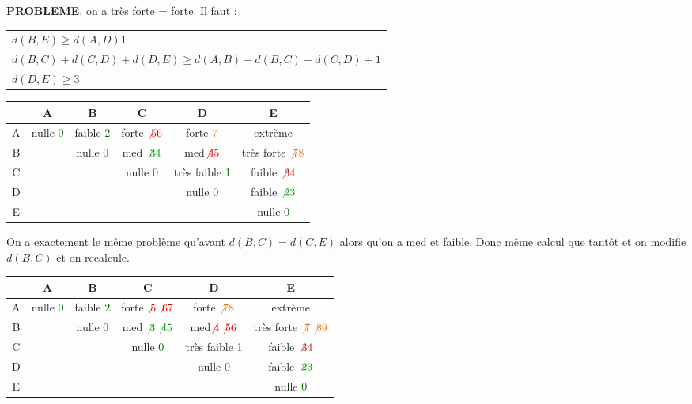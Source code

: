 \documentclass{article}
\newcommand{\gre}[1]{\textcolor{darkgreen}{#1}}
\newcommand{\ora}[1]{\textcolor{darko}{#1}}
\newcommand{\red}[1]{\textcolor{darkred}{#1}}
\begin{document}
\textbf{PROBLEME}, on a très forte = forte. Il faut :
\begin{center}
	\begin{tabular}{l}
	$d(B,E) \geq d(A,D) 1$ \\
	$d(B,C)+d(C,D)+d(D,E) \geq d(A,B)+d(B,C)+d(C,D)+1$ \\
	$d(D,E) \geq 3$
	\end{tabular}
\end{center}

\begin{center}
	\begin{tabular}{|*{6}{c|}}
	\hline
	& A & B & C & D & E \\
	\hline
	A & nulle \gre{0} & faible \gre{2}& forte $\red{\not{5}6}$& forte $\ora{7}$ & extrème \\
	\hline
	B & & nulle \gre{0}& med $\gre{\not{3} 4}$& med$\red{\not{4}5}$ & très forte $\ora{\not{7}8}$\\
	\hline
	C & & & nulle \gre{0} & très faible \gre{1}& faible $\red{\not{3} 4}$\\
	\hline
	D & & & & nulle \gre{0}& faible $\gre{\not{2} 3}$ \\
	\hline
	E & & & & & nulle \gre{0}\\
	\hline
	\end{tabular}
\end{center}

On a exactement le même problème qu'avant $d(B,C) = d(C,E)$ alors qu'on a med et faible. Donc même calcul que tantôt et on modifie $d(B,C)$ et on recalcule.

\begin{center}
	\begin{tabular}{|*{6}{c|}}
	\hline
	& A & B & C & D & E \\
	\hline
	A & nulle \gre{0} & faible \gre{2}& forte $\red{\not{5} \not{6} 7}$& forte $\ora{\not{7} 8}$ & extrème \\
	\hline
	B & & nulle \gre{0}& med $\gre{\not{3} \not{4} 5}$& med$\red{\not{4} \not{5} 6}$ & très forte $\ora{\not{7} \not{8} 9}$\\
	\hline
	C & & & nulle \gre{0} & très faible \gre{1}& faible $\red{\not{3} 4}$\\
	\hline
	D & & & & nulle \gre{0}& faible $\gre{\not{2} 3}$ \\
	\hline
	E & & & & & nulle \gre{0}\\
	\hline
	\end{tabular}
\end{center}
\end{document}
